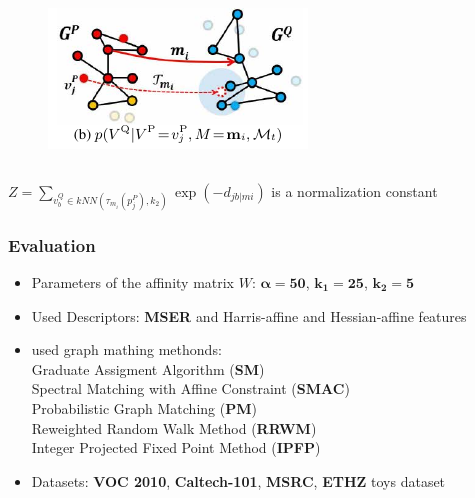 \documentclass[hyperref={pdfpagelabels=false}]{beamer}
\begin{document}
\begin{frame}[allowframebreaks]
\begin{itemize}
\begin{columns}[T]
    \begin{column}{0.3\textwidth}
	\begin{figure}
	  \includegraphics[scale=0.5]{fig3b.png}
	\end{figure}
    \end{column}
  \end{columns}

\end{itemize}

$Z = \sum_{v_b^Q\in kNN(\tau_{m_i}(p_j^P),k_2)}\exp(-d_{jb|mi})$ is a normalization constant

\end{frame}




\begin{frame}
\frametitle{Evaluation}

\begin{itemize}
 \item Parameters of the affinity matrix $W$: $\mathbf{\alpha = 50}$, $\mathbf{k_1=25}$, $\mathbf{k_2=5}$
 \item Used Descriptors: {\bf MSER} \cite{MSER} and Harris-affine and Hessian-affine features \cite{HarrisAffine}
 \item used graph mathing methonds: \\
      Graduate Assigment Algorithm ({\bf SM}) \cite{SM} \\
      Spectral Matching with Affine Constraint ({\bf SMAC}) \cite{SMAC} \\
      Probabilistic Graph Matching ({\bf PM}) \cite{PM}\\
      Reweighted Random Walk Method ({\bf RRWM})\cite{MinsuChoRRW}\\
      Integer Projected Fixed Point Method ({\bf IPFP}) \cite{IPFP}
  \item Datasets: {\bf VOC 2010}, {\bf Caltech-101}, {\bf MSRC}, {\bf ETHZ} toys dataset   
   
\end{itemize}

\end{frame}
\end{document}
